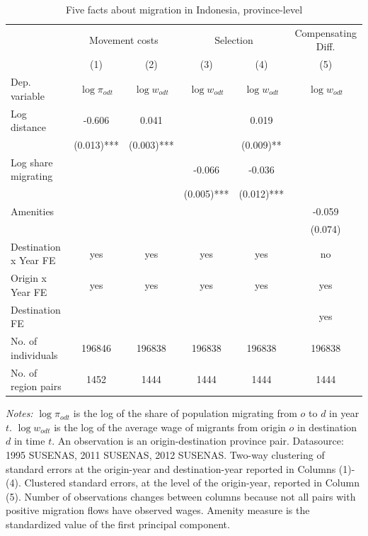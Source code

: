 \begin{table}[hbpt] \begin{center}\begin{threeparttable}\caption{ {Five facts about migration in Indonesia, province-level    }} \begin{tabular}{l*{5}c} \toprule
&\multicolumn{2}{c}{Movement costs}&\multicolumn{2}{c}{Selection}&\multicolumn{1}{c}{Compensating Diff.}\\
&(1)&(2)&(3)&(4)&(5)\\
Dep. variable&$\log \pi_{odt}$&$\log w_{odt}$ &$\log w_{odt}$ &$\log w_{odt}$ &$\log w_{odt}$ \\
\midrule
Log distance&-0.606&0.041&&0.019&\\
&(0.013)***&(0.003)***&&(0.009)**&\\
Log share migrating&&&-0.066&-0.036&\\
&&&(0.005)***&(0.012)***&\\
Amenities&&&&&-0.059\\
&&&&&(0.074)\\
\midrule
Destination x Year FE&yes&yes&yes&yes&no\\
Origin x Year FE&yes&yes&yes&yes&yes\\
Destination FE&&&&&yes\\
No. of individuals&196846&196838&196838&196838&196838\\
No. of region pairs&1452&1444&1444&1444&1444\\
\bottomrule \end{tabular} \label{Five facts about migration in Indonesia, province-level    } \begin{tablenotes} \item {\footnotesize \emph{Notes: } $\log \pi_{odt}$ is the log of the share of population migrating from $ o $ to $ d $ in year $ t $. $\log w_{odt}$ is the log of the average wage of migrants from origin $ o $ in destination $ d $ in time $ t $. An observation is an origin-destination province pair. Datasource: 1995 SUSENAS, 2011 SUSENAS, 2012 SUSENAS. Two-way clustering of standard errors at the origin-year and destination-year reported in Columns (1)-(4). Clustered standard errors, at the level of the origin-year, reported in Column (5). Number of observations changes between columns because not all pairs with positive migration flows have observed wages. Amenity measure is the standardized value of the first principal component. } \end{tablenotes} \end{threeparttable} \end{center} \end{table}
